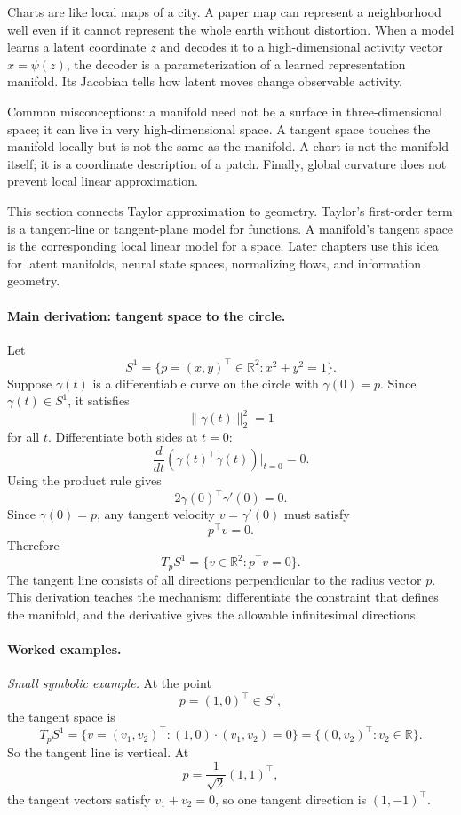 Charts are like local maps of a city. A paper map can represent a neighborhood well even if it cannot represent the whole earth without distortion. When a model learns a latent coordinate \(z\) and decodes it to a high-dimensional activity vector \(x=\psi(z)\), the decoder is a parameterization of a learned representation manifold. Its Jacobian tells how latent moves change observable activity.

Common misconceptions: a manifold need not be a surface in three-dimensional space; it can live in very high-dimensional space. A tangent space touches the manifold locally but is not the same as the manifold. A chart is not the manifold itself; it is a coordinate description of a patch. Finally, global curvature does not prevent local linear approximation.

This section connects Taylor approximation to geometry. Taylor's first-order term is a tangent-line or tangent-plane model for functions. A manifold's tangent space is the corresponding local linear model for a space. Later chapters use this idea for latent manifolds, neural state spaces, normalizing flows, and information geometry.

\paragraph{Main derivation: tangent space to the circle.}
Let
\[
S^1=\{p=(x,y)^\top\in\mathbb{R}^2:x^2+y^2=1\}.
\]
Suppose \(\gamma(t)\) is a differentiable curve on the circle with \(\gamma(0)=p\). Since \(\gamma(t)\in S^1\), it satisfies
\[
\|\gamma(t)\|_2^2=1
\]
for all \(t\). Differentiate both sides at \(t=0\):
\[
\frac{d}{dt}\left(\gamma(t)^\top\gamma(t)\right)\bigg|_{t=0}=0.
\]
Using the product rule gives
\[
2\gamma(0)^\top\gamma'(0)=0.
\]
Since \(\gamma(0)=p\), any tangent velocity \(v=\gamma'(0)\) must satisfy
\[
p^\top v=0.
\]
Therefore
\[
T_pS^1=\{v\in\mathbb{R}^2:p^\top v=0\}.
\]
The tangent line consists of all directions perpendicular to the radius vector \(p\). This derivation teaches the mechanism: differentiate the constraint that defines the manifold, and the derivative gives the allowable infinitesimal directions.

\paragraph{Worked examples.}
\emph{Small symbolic example.} At the point
\[
p=(1,0)^\top\in S^1,
\]
the tangent space is
\[
T_pS^1=\{v=(v_1,v_2)^\top:(1,0)\cdot(v_1,v_2)=0\}
=\{(0,v_2)^\top:v_2\in\mathbb{R}\}.
\]
So the tangent line is vertical. At
\[
p=\frac{1}{\sqrt{2}}(1,1)^\top,
\]
the tangent vectors satisfy \(v_1+v_2=0\), so one tangent direction is \((1,-1)^\top\).

